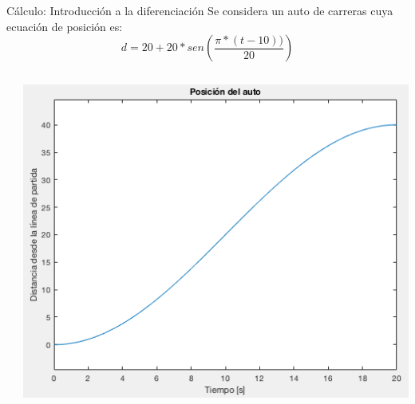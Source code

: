 \documentclass{bredelebeamer}
\begin{document}
\begin{frame}{Cálculo: Introducción a la diferenciación}
Se considera un auto de carreras cuya ecuación de posición es:
\begin{equation*}
d=20+20*sen(\frac{\pi *(t-10))}{20})
\end{equation*}
\begin{columns}
\begin{column}{0.5\textwidth}
\end{column}
\begin{column}{0.5\textwidth}
\begin{center}
\includegraphics[scale=0.3]{images/fig6.png}
\end{center}
\end{column}
\end{columns}
\end{frame}
\end{document}
